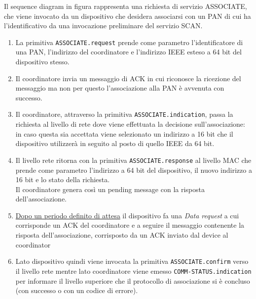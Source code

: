Il sequence diagram in figura rappresenta una richiesta di servizio ASSOCIATE, che viene invocato da un dispositivo che desidera associarsi con un PAN di cui ha l'identificativo da una invocazione preliminare del servizio SCAN. 

\begin{enumerate}
   \item La primitiva \texttt{ASSOCIATE.request} prende come parametro l'identificatore di una PAN, l'indirizzo del coordinatore e l'indirizzo IEEE esteso a 64 bit del dispositivo stesso.
   \item 
   Il coordinatore invia un messaggio di ACK in cui riconosce la ricezione del messaggio ma non per questo l'associazione alla PAN è avvenuta con successo.
   \item Il coordinatore, attraverso la primitiva \texttt{ASSOCIATE.indication}, passa la richiesta al livello di rete dove viene effettuata la decisione sull'associazione:
   in caso questa sia accettata viene selezionato un indirizzo a 16 bit che il dispositivo utilizzerà in seguito al posto di quello IEEE da 64 bit.
   \item Il livello rete ritorna con la primitiva \texttt{ASSOCIATE.response} al livello MAC che prende come parametro l'indirizzo a 64 bit del dispositivo, il nuovo indirizzo a 16 bit e lo stato della richiesta.\\
   Il coordinatore genera così un pending message con la risposta dell'associazione.
   \item \ul{Dopo un periodo definito di attesa} il dispositivo fa una \textit{Data request} a cui corrisponde un ACK del coordinatore e a seguire il messaggio contenente la risposta dell'associazione, corrisposto da un ACK inviato dal device al coordinator
   \item Lato dispositivo quindi viene invocata la primitiva \texttt{ASSOCIATE.confirm} verso il livello rete mentre lato coordinatore viene emesso \texttt{COMM-STATUS.indication} per informare il livello superiore che il protocollo di associazione si è concluso (con successo o con un codice di errore).
\end{enumerate}

